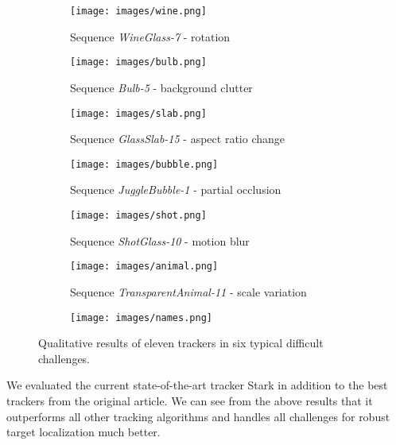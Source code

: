 \begin{figure}[h]
     \centering
     \begin{subfigure}[b]{0.49\textwidth}
         \centering
         \texttt{[image: images/wine.png]}
         \caption{Sequence \textit{WineGlass-7} - rotation}
         \label{fig:y equals x}
     \end{subfigure}
     \hfill
     \begin{subfigure}[b]{0.49\textwidth}
         \centering
         \texttt{[image: images/bulb.png]}
          \caption{Sequence \textit{Bulb-5} - background clutter}
         \label{fig:three sin x}
     \end{subfigure}
     \hfill
          \begin{subfigure}[b]{0.49\textwidth}
         \centering
         \texttt{[image: images/slab.png]}
          \caption{Sequence \textit{GlassSlab-15} - aspect ratio change}
         \label{fig:y equals x}
     \end{subfigure}
     \hfill
     \begin{subfigure}[b]{0.49\textwidth}
         \centering
         \texttt{[image: images/bubble.png]}
         \caption{Sequence \textit{JuggleBubble-1} - partial occlusion}
         \label{fig:three sin x}
     \end{subfigure}
     \hfill
          \begin{subfigure}[b]{0.49\textwidth}
         \centering
         \texttt{[image: images/shot.png]}
         \caption{Sequence \textit{ShotGlass-10} - motion blur \hphantom{phantom text}}
         \label{fig:y equals x}
     \end{subfigure}
     \hfill
     \begin{subfigure}[b]{0.49\textwidth}
         \centering
         \texttt{[image: images/animal.png]}
         \caption{Sequence \textit{TransparentAnimal-11} - scale variation}
         \label{fig:three sin x}
     \end{subfigure}
     \hfill
     \begin{subfigure}[b]{\textwidth}
         \centering
         \texttt{[image: images/names.png]}
         \label{fig:five over x}
     \end{subfigure}
        \caption{Qualitative results of eleven trackers in six typical difficult challenges.}
        \label{fig:three graphs}
\end{figure}
We evaluated the current state-of-the-art tracker Stark in addition to the best trackers from the original article. We can see from the above results that it outperforms all other tracking algorithms and handles all challenges for robust target localization much better.